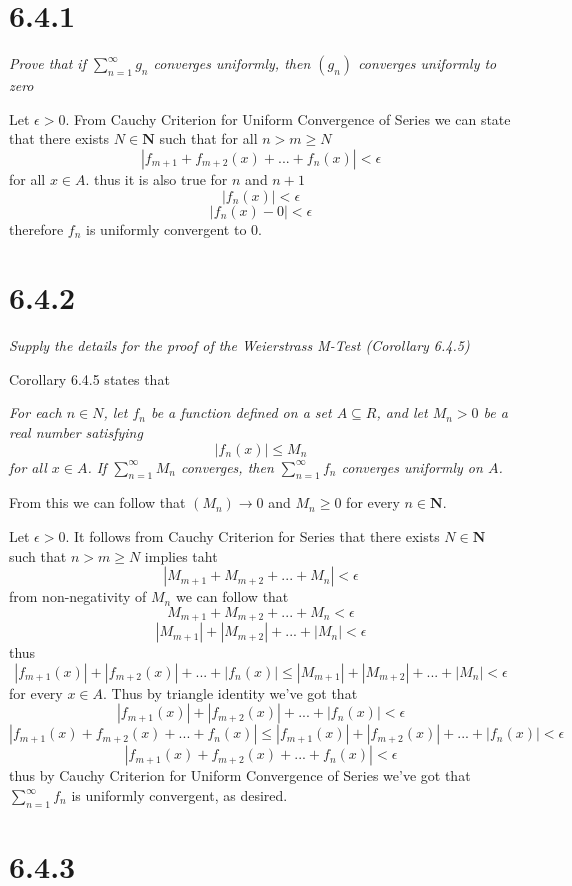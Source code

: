 \documentclass[11pt,oneside,titlepage]{book}
\begin{document}
\section*{6.4.1}
\textit{Prove that if $\sum_{n = 1}^{\infty}{g_n}$ converges uniformly, then
  $(g_n)$ converges uniformly to zero}

Let $\epsilon > 0$. From Cauchy Criterion for Uniform Convergence of Series we
can state that there exists $N \in \textbf{N}$ such that for all $n > m \geq N$
$$|f_{m + 1} + f_{m + 2}(x) + ... + f_n(x)| < \epsilon$$
for all $x \in A$. 
thus it is also true for $n$ and $n + 1$
$$|f_n(x)| < \epsilon$$
$$|f_n(x) - 0| < \epsilon$$
therefore $f_n$ is uniformly convergent to $0$.

\section*{6.4.2}
\textit{Supply the details for the proof of the Weierstrass M-Test
  (Corollary 6.4.5)}

Corollary 6.4.5 states that

\textit{For each $n \in N$, let $f_n$ be a function defined on a set
  $A \subseteq R$, and let $M_n > 0$ be a real number satisfying }
$$|f_n(x)| \leq M_n$$
\textit{for all $x \in A$. If $\sum_{n = 1}^{\infty}M_n$ converges, then
  $\sum_{n = 1}^{\infty}f_n$ converges uniformly on $A$.}

From this we can follow that $(M_n) \to 0$ and 
$M_n \geq 0$ for every $n \in \textbf{N}$.

Let $\epsilon > 0$. It follows from Cauchy Criterion for Series that there
exists $N \in \textbf{N}$ such that $n >  m \geq N$ implies taht
$$|M_{m + 1} + M_{m + 2} + ... + M_n| < \epsilon$$
from non-negativity of $M_n$ we can follow that
$$M_{m + 1} + M_{m + 2} + ... + M_n < \epsilon$$
$$|M_{m + 1}| + |M_{m + 2}| + ... + |M_n| < \epsilon$$
thus
$$|f_{m + 1}(x)| + |f_{m + 2}(x)| + ... + |f_n(x)|
\leq |M_{m + 1}| + |M_{m + 2}| + ... + |M_n| < \epsilon$$
for every $x \in A$. Thus by triangle identity we've got that
$$|f_{m + 1}(x)| + |f_{m + 2}(x)| + ... + |f_n(x)| < \epsilon$$
$$|f_{m + 1}(x) + f_{m + 2}(x) + ... + f_n(x)|
\leq |f_{m + 1}(x)| + |f_{m + 2}(x)| + ... + |f_n(x)| < \epsilon$$
$$|f_{m + 1}(x) + f_{m + 2}(x) + ... + f_n(x)|  < \epsilon$$
thus by Cauchy Criterion for Uniform Convergence of Series we've got that
$\sum_{n = 1}^{\infty}{f_n}$ is uniformly convergent, as desired.

\section*{6.4.3}
\end{document}
